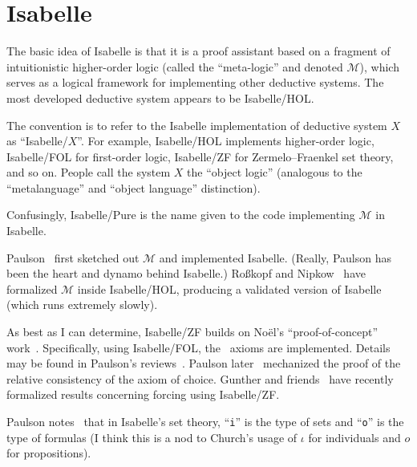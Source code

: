\chapter{Isabelle}

\begin{node}\label{isabelle-0000}%
The basic idea of Isabelle is that it is a proof assistant based on a
fragment of intuitionistic higher-order logic (called the ``meta-logic''
and denoted $\mathcal{M}$), which serves as a logical
framework for implementing other deductive systems. The most developed
deductive system appears to be Isabelle/HOL.

\begin{node}[Terminology]\label{isabelle-0002}%
The convention is to refer to the Isabelle implementation of deductive
system $X$ as ``Isabelle/$X$''. For example, Isabelle/HOL implements
higher-order logic, Isabelle/FOL for first-order logic, Isabelle/ZF for
Zermelo--Fraenkel set theory, and so on. People call the system $X$ the
``object logic'' (analogous to the ``metalanguage'' and ``object
language'' distinction).

Confusingly, Isabelle/Pure is the name given to the code implementing
$\mathcal{M}$ in Isabelle.
\end{node}

\begin{node}[References]\label{isabelle-0001}%
Paulson~\cite{paulson1988foundation} first sketched out $\mathcal{M}$
and implemented Isabelle. (Really, Paulson has been the heart and dynamo
behind Isabelle.)
Ro{\ss}kopf and Nipkow~\cite{Rosskopf2022formalization} have formalized
$\mathcal{M}$ inside Isabelle/HOL, producing a validated version of
Isabelle (which runs extremely slowly). 
\end{node}
\end{node}

\begin{node}[Isabelle/ZF]\label{isabelle-0003}%
As best as I can determine, Isabelle/ZF builds on No\"{e}l's
``proof-of-concept'' work~\cite{Noel1993experimenting}. Specifically,
using Isabelle/FOL, the \ZF\ axioms are implemented. Details may be
found in Paulson's reviews~\cite{Paulson1993set,Paulson1995set}. Paulson
later~\cite{Paulson2003ac} mechanized the proof of the relative
consistency of the axiom of choice. Gunther and friends~\cite{gunther2020formalization}
have recently formalized results concerning forcing using Isabelle/ZF.

Paulson notes~\cite[\S2.2]{Paulson1993set} that in Isabelle's set
theory, ``\texttt{i}'' is the type of sets and ``\texttt{o}'' is the
type of formulas (I think this is a nod to Church's usage of $\iota$ for
individuals and $o$ for propositions). 
\end{node}

